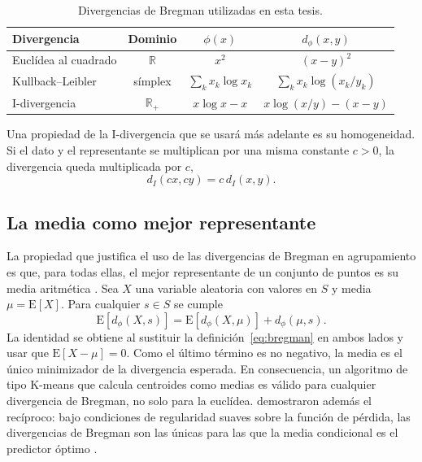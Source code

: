 \begin{table}[ht]
  \centering
  {\footnotesize
  \begin{tabular}{@{}lccc@{}}
    \toprule
    \textbf{Divergencia} & \textbf{Dominio} & $\phi(x)$ & $d_\phi(x,y)$ \\
    \midrule
    Euclídea al cuadrado & $\mathbb{R}$ & $x^2$ & $(x-y)^2$ \\
    Kullback--Leibler & símplex & $\sum_k x_k \log x_k$ & $\sum_k x_k \log (x_k/y_k)$ \\
    I-divergencia & $\mathbb{R}_{+}$ & $x \log x - x$ & $x \log (x/y) - (x - y)$ \\
    \bottomrule
  \end{tabular}
  }
  \caption{Divergencias de Bregman utilizadas en esta tesis.}
  \label{tab:bregman}
\end{table}

Una propiedad de la I-divergencia que se usará más adelante es su homogeneidad.
Si el dato y el representante se multiplican por una misma constante $c > 0$, la
divergencia queda multiplicada por $c$,
\begin{equation}\label{eq:homogeneidad}
  d_I(cx, cy) = c \, d_I(x, y).
\end{equation}

\subsection{La media como mejor representante}

La propiedad que justifica el uso de las divergencias de Bregman en agrupamiento
es que, para todas ellas, el mejor representante de un conjunto de puntos es su
media aritmética \cite[Prop.~1]{Banerjee2005}. Sea $X$ una variable aleatoria con
valores en $S$ y media $\mu = \mathrm{E}[X]$. Para cualquier $s \in S$ se cumple
\begin{equation}\label{eq:media}
  \mathrm{E}[d_\phi(X, s)] = \mathrm{E}[d_\phi(X, \mu)] + d_\phi(\mu, s).
\end{equation}
La identidad se obtiene al sustituir la definición~\eqref{eq:bregman} en ambos
lados y usar que $\mathrm{E}[X - \mu] = 0$. Como el último término es no negativo,
la media es el único minimizador de la divergencia esperada. En consecuencia, un
algoritmo de tipo K-means que calcula centroides como medias es válido para
cualquier divergencia de Bregman, no solo para la euclídea.
\cite{Banerjee2005opt} demostraron además el recíproco: bajo condiciones de
regularidad suaves sobre la función de pérdida, las divergencias de Bregman son
las únicas para las que la media condicional es el predictor óptimo
\cite[Teoremas~3 y~4]{Banerjee2005opt}.


